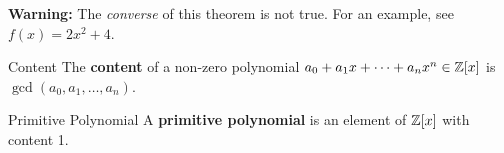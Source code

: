 \documentclass[letterpaper]{article}
\begin{document}
\textbf{Warning:} The \emph{converse} of this theorem is not true. For an example, see $f(x) = 2x^2 + 4$. 

\begin{definition}{Content}{}
    The \textbf{content} of a non-zero polynomial $a_0 + a_1 x + \dots + a_n x^n \in \mathbb{Z}[x]$ is $\gcd(a_0, a_1, \dots, a_n)$. 
\end{definition}

\begin{definition}{Primitive Polynomial}
    A \textbf{primitive polynomial} is an element of $\mathbb{Z}[x]$ with content 1. 
\end{definition}
\end{document}
